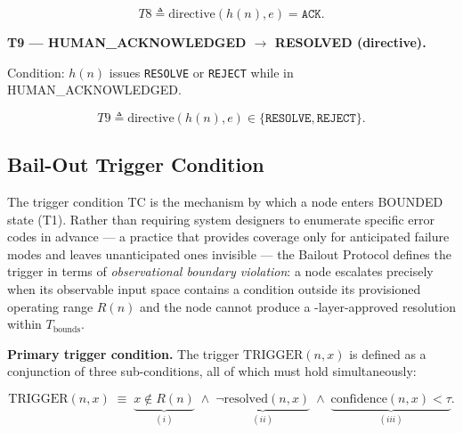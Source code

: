 \begin{equation}
T8 \triangleq \text{directive}(h(n), e) = \texttt{ACK}. \tag{T8}
\end{equation}

\medskip\noindent\textbf{T9 — HUMAN\_ACKNOWLEDGED $\rightarrow$ RESOLVED (directive).}

Condition: $h(n)$ issues \texttt{RESOLVE} or \texttt{REJECT} while in HUMAN\_ACKNOWLEDGED.

\begin{equation}
T9 \triangleq \text{directive}(h(n), e) \in \{\texttt{RESOLVE}, \texttt{REJECT}\}. \tag{T9}
\end{equation}

\subsection{Bail-Out Trigger Condition}\label{sec:bailout-trigger}

The trigger condition TC is the mechanism by which a node enters BOUNDED state (T1). Rather than requiring system designers to enumerate specific error codes in advance — a practice that provides coverage only for anticipated failure modes and leaves unanticipated ones invisible — the Bailout Protocol defines the trigger in terms of \emph{observational boundary violation}: a node escalates precisely when its observable input space contains a condition outside its provisioned operating range $R(n)$ and the node cannot produce a \fact-layer-approved resolution within $T_{\text{bounds}}$.

\medskip\noindent\textbf{Primary trigger condition.} The trigger $\text{TRIGGER}(n, x)$ is defined as a conjunction of three sub-conditions, all of which must hold simultaneously:

\begin{equation}
\text{TRIGGER}(n, x) \;\equiv\; \underbrace{x \notin R(n)}_{(i)} \; \land\; \underbrace{\neg\text{resolved}(n, x)}_{(ii)} \; \land\; \underbrace{\text{confidence}(n, x) < \tau}_{(iii)}. \tag{TC}
\end{equation}

